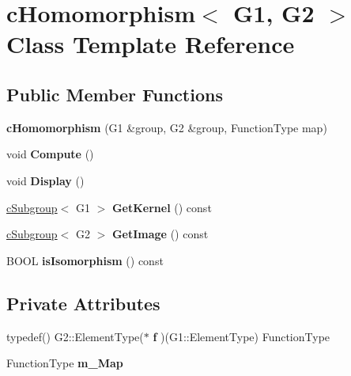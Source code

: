 \hypertarget{classcHomomorphism}{
\section{c\-Homomorphism$<$ \-G1, \-G2 $>$ \-Class \-Template \-Reference}
\label{classcHomomorphism}
}
\subsection*{\-Public \-Member \-Functions}
\begin{DoxyCompactItemize}
\item 
\hypertarget{classcHomomorphism_a826f07eaa6c431de9fc8ad236ebb7502}{
{\bfseries c\-Homomorphism} (\-G1 \&group, \-G2 \&group, \-Function\-Type map)}
\label{classcHomomorphism_a826f07eaa6c431de9fc8ad236ebb7502}

\item 
\hypertarget{classcHomomorphism_a4f6919efcd1c8446207a5150e3f29143}{
void {\bfseries \-Compute} ()}
\label{classcHomomorphism_a4f6919efcd1c8446207a5150e3f29143}

\item 
\hypertarget{classcHomomorphism_a0afe7b713cdb3e7628d049011334b539}{
void {\bfseries \-Display} ()}
\label{classcHomomorphism_a0afe7b713cdb3e7628d049011334b539}

\item 
\hypertarget{classcHomomorphism_a0f6fe4c7df91a345cd26023cf9b7c29d}{
\hyperlink{classcSubgroup}{c\-Subgroup}$<$ \-G1 $>$ {\bfseries \-Get\-Kernel} () const }
\label{classcHomomorphism_a0f6fe4c7df91a345cd26023cf9b7c29d}

\item 
\hypertarget{classcHomomorphism_ae2a5c5ab1fea57af03dbb926b05c5edc}{
\hyperlink{classcSubgroup}{c\-Subgroup}$<$ \-G2 $>$ {\bfseries \-Get\-Image} () const }
\label{classcHomomorphism_ae2a5c5ab1fea57af03dbb926b05c5edc}

\item 
\hypertarget{classcHomomorphism_ae5514786d9d5f0a185e5465c11075f13}{
\-B\-O\-O\-L {\bfseries is\-Isomorphism} () const }
\label{classcHomomorphism_ae5514786d9d5f0a185e5465c11075f13}

\end{DoxyCompactItemize}
\subsection*{\-Private \-Attributes}
\begin{DoxyCompactItemize}
\item 
\hypertarget{classcHomomorphism_a8b597c591cbbfb2a6ed415978c95d953}{
typedef() \-G2\-::\-Element\-Type($\ast$ {\bfseries f} )(\-G1\-::\-Element\-Type) \-Function\-Type}
\label{classcHomomorphism_a8b597c591cbbfb2a6ed415978c95d953}

\item 
\hypertarget{classcHomomorphism_ae6f45d109f0163c4ad74e5c30bcfe12c}{
\-Function\-Type {\bfseries m\-\_\-\-Map}}
\label{classcHomomorphism_ae6f45d109f0163c4ad74e5c30bcfe12c}

\end{DoxyCompactItemize}

